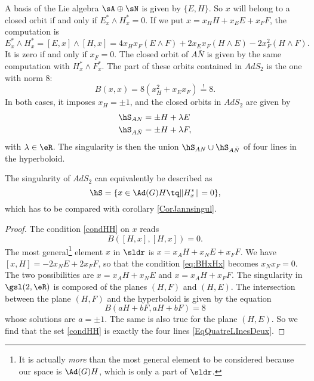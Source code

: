A basis of the Lie algebra $\sA\oplus\sN$ is given by $\{E,H\}$. So $x$ will belong to a closed orbit if and only if $E_x^*\wedge H^*_x=0$. If we put $x=x_HH+x_EE+x_FF$, the computation is
\[
E_x^*\wedge H^*_x=[E,x]\wedge[H,x]
                 =4x_Hx_F (E\wedge F)+2x_Ex_F (H\wedge E)-2x_F^2 (H\wedge F).
\]
It is zero if and only if $x_F=0$. The closed orbit of $A\bar{N}$ is given by the same computation with $H^*_x\wedge F^*_x$. The part of these orbits contained in $AdS_2$ is the one with norm $8$:
\[
B(x,x)=8(x_H^2+x_Ex_F)\stackrel{!}{=}8.
\]
In both cases, it imposes $x_H=\pm 1$, and the closed orbits in $AdS_2$ are given by
\begin{subequations}\label{EqQuatreLInesDeux}
\begin{align}		
\hS_{AN}&=\pm H+\lambda E\\
\hS_{A\bar N}&=\pm H+\lambda F,
\end{align}
\end{subequations}
with $\lambda\in\eR$. The singularity is then the union $\hS_{AN}\cup\hS_{A\bar N}$ of four lines in the hyperboloid.

\begin{proposition}
 The singularity of $AdS_2$ can equivalently be described as
\begin{equation}\label{condHH}
\hS=\{x \in \Ad(G)H \tq \|H^*_x\|=0\},
\end{equation}
which has to be compared with corollary \ref{CorJannsingul}.
\label{HSing}
\label{PropAdSDeuxJannule}
\end{proposition}

\begin{proof}
The condition \eqref{condHH} on $x$ reads
\begin{equation}\label{eq:BHxHx}
B([H,x],[H,x])=0.
\end{equation}
The most general\footnote{It is actually \emph{more} than the most general element to be considered because our space is $\Ad(G)H$, which is only a part of $\sldr$.} element $x$ in $\sldr$ is $x=x_AH+x_NE+x_FF$. We have $[x,H]=-2x_NE+2x_FF$, so that the condition \eqref{eq:BHxHx} becomes $x_Nx_F=0$. The two possibilities are $x=x_AH+x_NE$ and $x=x_AH+x_FF$. The singularity in $\gsl(2,\eR)$ is composed of the planes $(H,F)$ and $(H,E)$. The intersection between the plane $(H,F)$ and the hyperboloid is given by the equation
\[
B(aH+bF,aH+bF)=8
\]
whose solutions are $a=\pm 1$. The same is also true for the plane $(H,E)$. So we find that the set \eqref{condHH} is exactly the four lines  \eqref{EqQuatreLInesDeux}.

\end{proof}


